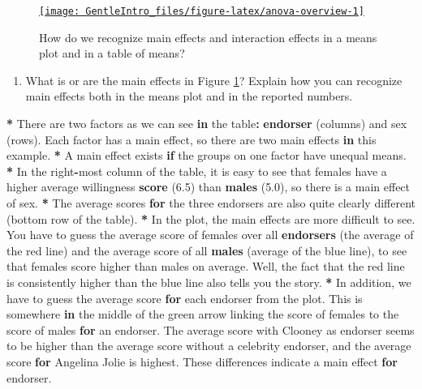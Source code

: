 \documentclass[a4paper]{book}
\newenvironment{Shaded}{\begin{snugshade}}{\end{snugshade}}
\newcommand{\KeywordTok}[1]{\textcolor[rgb]{0,0,0}{\textbf{#1}}}
\newcommand{\FloatTok}[1]{\textcolor[rgb]{0.00,0.00,0.00}{#1}}
\newcommand{\StringTok}[1]{\textcolor[rgb]{0.00,0.00,0.00}{#1}}
\newcommand{\ControlFlowTok}[1]{\textcolor[rgb]{0.00,0.00,0.00}{\textbf{#1}}}
\newcommand{\OperatorTok}[1]{\textcolor[rgb]{0.00,0.00,0.00}{\textbf{#1}}}
\newcommand{\NormalTok}[1]{#1}
\providecommand{\tightlist}{%
  \setlength{\itemsep}{0pt}\setlength{\parskip}{0pt}}
\theoremstyle{definition}
\theoremstyle{definition}
\theoremstyle{definition}
\theoremstyle{remark}
\begin{document}
\begin{figure}[H]
\href{http://82.196.4.233:3838/apps/anova-interaction/}{\texttt{[image: GentleIntro\_files/figure-latex/anova-overview-1]} }\caption{How do we recognize main effects and interaction effects in a means plot and in a table of means?}\label{fig:anova-overview}
\end{figure}

\begin{enumerate}
\def\labelenumi{\arabic{enumi}.}
\tightlist
\item
  What is or are the main effects in Figure \ref{fig:anova-overview}?
  Explain how you can recognize main effects both in the means plot and
  in the reported numbers.
\end{enumerate}

\begin{Shaded}
\begin{Highlighting}[]
\OperatorTok{*}\StringTok{ }\NormalTok{There are two factors as we can see }\ControlFlowTok{in}\NormalTok{ the table}\OperatorTok{:}\StringTok{ }\KeywordTok{endorser}\NormalTok{ (columns) and sex}
\NormalTok{(rows). Each factor has a main effect, so there are two main effects }\ControlFlowTok{in}\NormalTok{ this}
\NormalTok{example.}
\OperatorTok{*}\StringTok{ }\NormalTok{A main effect exists }\ControlFlowTok{if}\NormalTok{ the groups on one factor have unequal means.}
\OperatorTok{*}\StringTok{ }\NormalTok{In the right}\OperatorTok{-}\NormalTok{most column of the table, it is easy to see that females have a}
\NormalTok{higher average willingness }\KeywordTok{score}\NormalTok{ (}\FloatTok{6.5}\NormalTok{) than }\KeywordTok{males}\NormalTok{ (}\FloatTok{5.0}\NormalTok{), so there is a main}
\NormalTok{effect of sex.}
\OperatorTok{*}\StringTok{ }\NormalTok{The average scores }\ControlFlowTok{for}\NormalTok{ the three endorsers are also quite clearly different}
\NormalTok{(bottom row of the table).}
\OperatorTok{*}\StringTok{ }\NormalTok{In the plot, the main effects are more difficult to see. You have to guess}
\NormalTok{the average score of females over all }\KeywordTok{endorsers}\NormalTok{ (the average of the red line)}
\NormalTok{and the average score of all }\KeywordTok{males}\NormalTok{ (average of the blue line), to see that}
\NormalTok{females score higher than males on average. Well, the fact that the red line}
\NormalTok{is consistently higher than the blue line also tells you the story.}
\OperatorTok{*}\StringTok{ }\NormalTok{In addition, we have to guess the average score }\ControlFlowTok{for}\NormalTok{ each endorser from the}
\NormalTok{plot. This is somewhere }\ControlFlowTok{in}\NormalTok{ the middle of the green arrow linking the score of}
\NormalTok{females to the score of males }\ControlFlowTok{for}\NormalTok{ an endorser. The average score with Clooney}
\NormalTok{as endorser seems to be higher than the average score without a celebrity}
\NormalTok{endorser, and the average score }\ControlFlowTok{for}\NormalTok{ Angelina Jolie is highest. These}
\NormalTok{differences indicate a main effect }\ControlFlowTok{for}\NormalTok{ endorser.}
\end{Highlighting}
\end{Shaded}
\end{document}
